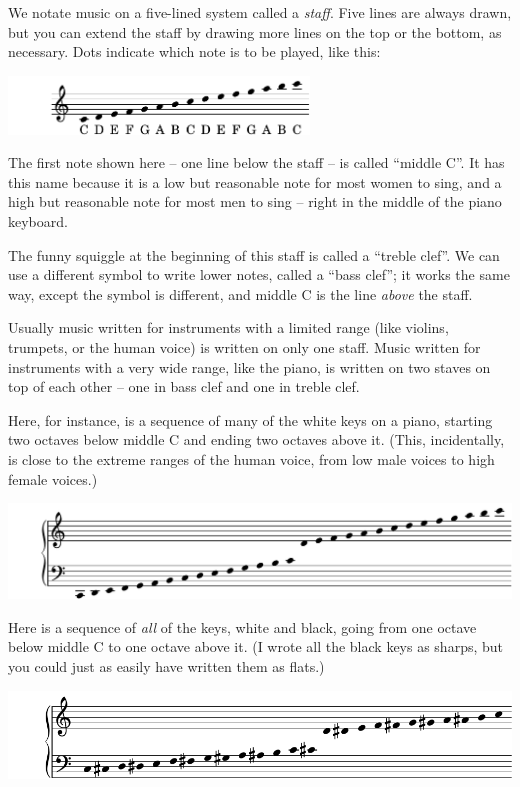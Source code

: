 \documentclass[10pt]{article}
\begin{document}
We notate music on a five-lined system called a {\it staff}. Five lines are always drawn, but you can extend 
the staff by drawing more lines on the top or the bottom, as necessary. Dots indicate which note is to be played,
like this:

\begin{center}\includegraphics[width=0.6\textwidth]{staff1-crop.pdf}\end{center}

The first note shown here -- one line below the staff -- is called ``middle C''. It has this name because it is a
low but reasonable note for most women to sing, and a high but reasonable note for most men to sing -- right in the 
middle of the piano keyboard.

The funny squiggle at the beginning of this staff is called a ``treble clef''. We can use a different symbol to write
lower notes, called a ``bass clef''; it works the same way, except the symbol is different, and middle C is the line
{\it above} the staff.

Usually music written for instruments with a limited range (like violins, trumpets, or the human voice)
is written on only one staff. Music written for instruments with a very wide range, like the piano, is 
written on two staves on top of each other -- one in bass clef and one in treble clef.

Here, for instance, is a sequence of many of the white keys on a piano, starting two octaves below middle C
and ending two octaves above it. (This, incidentally, is close to the extreme ranges of the human voice, from
low male voices to high female voices.)

\begin{center}\includegraphics[width=\textwidth]{staff2-crop.pdf}\end{center}

Here is a sequence of {\it all} of the keys, white and black, going from one octave below middle C to one 
octave above it. (I wrote all the black keys as sharps, but you could just as easily have written them as flats.)

\begin{center}\includegraphics[width=\textwidth]{staff3-crop.pdf}\end{center}
\end{document}
